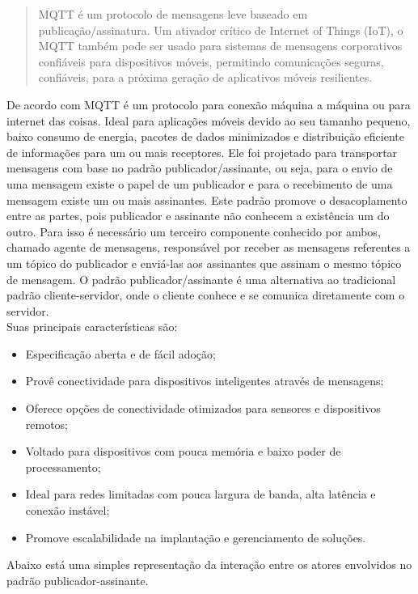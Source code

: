 \begin{quote}
	MQTT é um protocolo de mensagens leve baseado em publicação/assinatura. Um ativador crítico de Internet of Things (IoT), o MQTT também pode ser usado para sistemas de mensagens corporativos confiáveis para dispositivos móveis, permitindo comunicações seguras, confiáveis, para a próxima geração de aplicativos móveis resilientes. \cite{Maynard}
\end{quote}

De acordo com \cite{MQTTorg} MQTT é um protocolo para conexão máquina a máquina ou para internet das coisas. Ideal para aplicações móveis devido ao seu tamanho pequeno, baixo consumo de energia, pacotes de dados minimizados e distribuição eficiente de informações para um ou mais receptores. Ele foi projetado para transportar mensagens com base no padrão publicador/assinante, ou seja, para o envio de uma mensagem existe o papel de um publicador e para o recebimento de uma mensagem existe um ou mais assinantes. Este padrão promove o desacoplamento entre as partes, pois publicador e assinante não conhecem a existência um do outro. Para isso é necessário um terceiro componente conhecido por ambos, chamado agente de mensagens, responsável por receber as mensagens referentes a um tópico do publicador e enviá-las aos assinantes que assinam o mesmo tópico de mensagem. O padrão publicador/assinante é uma alternativa ao tradicional padrão cliente-servidor, onde o cliente conhece e se comunica diretamente com o servidor. \\
\indent Suas principais características são:

\begin{itemize}
	\item Especificação aberta e de fácil adoção;
	\item Provê conectividade para dispositivos inteligentes através de mensagens;
	\item Oferece opções de conectividade otimizados para sensores e dispositivos remotos;
	\item Voltado para dispositivos com pouca memória e baixo poder de processamento;
	\item Ideal para redes limitadas com pouca largura de banda, alta latência e conexão instável;
	\item Promove escalabilidade na implantação e gerenciamento de soluções. 
\end{itemize}

Abaixo está uma simples representação da interação entre os atores envolvidos no padrão publicador-assinante.

